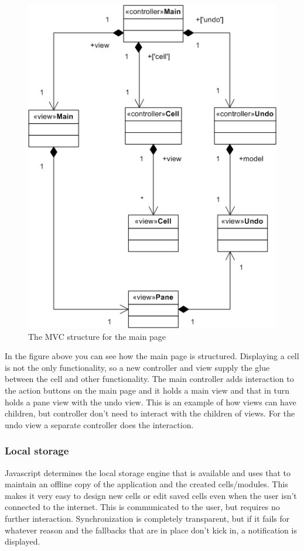 \documentclass{report}
\begin{document}
					\begin{figure}[htb]
						\begin{center}
							\includegraphics[width=\linewidth]{main_struct.png}
							\caption{The MVC structure for the main page}
							\label{fig: main struct}
						\end{center}
					\end{figure}	
					In the figure above you can see how the main page is structured. Displaying a cell is not the only functionality, so a new controller and view supply the glue between the cell and other functionality. The main controller adds interaction to the action buttons on the main page and it holds a main view and that in turn holds a pane view with the undo view. This is an example of how views can have children, but controller don't need to interact with the children of views. For the undo view a separate controller does the interaction.
					
				\subsubsection{Local storage}
					Javascript determines the local storage engine that is available and uses that to maintain an offline copy of the application and the created cells/modules. This makes it very easy to design new cells or edit saved cells even when the user isn't connected to the internet. This is communicated to the user, but requires no further interaction. Synchronization is completely transparent, but if it fails for whatever reason and the fallbacks that are in place don't kick in, a notification is displayed.
		
\end{document}

